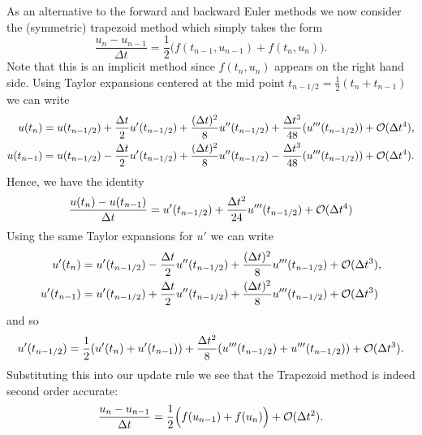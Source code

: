 As an alternative to the forward and backward 
Euler methods we now consider the (symmetric) trapezoid method 
which simply takes the form 
\begin{equation}\label{eq:trapezoid-method}
\frac{u_{n} - u_{n-1}}{\Delta t} 
= \frac{1}{2} \Big( f(t_{n-1}, u_{n-1}) + f(t_n, u_n) \Big).
\end{equation}
Note that this is an implicit method since $f(t_n, u_n)$ 
appears on the right hand side.
Using Taylor expansions
centered at the mid point $t_{n - 1/2} = \frac{1}{2} (t_n + t_{n-1})$
we can write 
\begin{equation*}
\begin{aligned}
    u(t_n) & = u(t_{n - 1/2}) + \frac{\Delta t}{2} 
    u'(t_{n - 1/2}) + \frac{(\Delta t)^2}{8} u''(t_{n - 1/2}) 
    + \frac{\Delta t^3}{48}(u'''(t_{n - 1/2}))
    + \mathcal{O}(\Delta t^4),\\
    u(t_{n-1}) &= u(t_{n - 1/2}) - \frac{\Delta t}{2} 
    u'(t_{n - 1/2}) + \frac{(\Delta t)^2}{8} u''(t_{n - 1/2}) 
    - \frac{\Delta t^3}{48}(u'''(t_{n - 1/2}))
    + \mathcal{O}(\Delta t^4).
\end{aligned}
\end{equation*}
Hence, we have the identity
\begin{equation*}
    \frac{u(t_n) - u(t_{n-1})}{\Delta t} 
    =  u'(t_{n-1/2})  + \frac{\Delta t^2}{24} u'''(t_{n - 1/2}) 
    + \mathcal{O}(\Delta t^4)
\end{equation*}
Using the same Taylor expansions for $u'$ we can write 
\begin{equation*}
\begin{aligned}
    u'(t_{n}) & = u'(t_{n-1/2}) - \frac{\Delta t}{2} u''(t_{n-1/2}) 
    + \frac{(\Delta t)^2}{8} u'''(t_{n-1/2}) + \mathcal{O}(\Delta t^3),\\
    u'(t_{n-1}) & = u'(t_{n-1/2}) + \frac{\Delta t}{2} u''(t_{n-1/2}) 
    + \frac{(\Delta t)^2}{8} u'''(t_{n-1/2}) + \mathcal{O}(\Delta t^3)
\end{aligned}
\end{equation*}
and so 
\begin{equation*}
    u'(t_{n - 1/2}) = \frac{1}{2} (u'(t_n) + u'(t_{n-1}))
     + \frac{\Delta t^2}{8} (u'''(t_{n-1/2}) + u'''(t_{n-1/2})) + \mathcal{O}(\Delta t^3).
\end{equation*}
Substituting this into our update rule we see that the 
Trapezoid method is indeed second order accurate:
\begin{equation*}
    \frac{u_{n} - u_{n-1}}{\Delta t} 
    = \frac{1}{2} \Big( f(u_{n-1}) + f(u_n) \Big) 
    + \mathcal{O}(\Delta t^2).
\end{equation*}





 